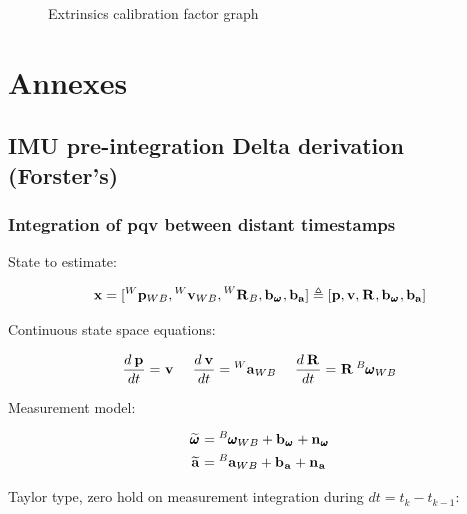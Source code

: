 \documentclass[11pt]{article}
\newcommand{\Rot}[2]{\prescript{#1}{}{\bfR}_{#2}}
\newcommand{\noise}{\bfn}
\newcommand{\bias}{\bfb}
\newcommand{\posi}[2]{\prescript{#1}{}{\bfp}_{#2}}
\newcommand{\vel}[2]{\prescript{#1}{}{\bfv}_{#2}}
\newcommand{\acc}[2]{\prescript{#1}{}{\bfa}_{#2}}
\newcommand{\accm}[2]{\prescript{#1}{}{\widetilde{\bfa}}_{#2}}
\newcommand{\angvel}[2]{\prescript{#1}{}{\pmb{\omega}}_{#2}}
\newcommand{\angvelm}[2]{\prescript{#1}{}{\widetilde{\pmb{\omega}}}_{#2}}
\begin{document}
\begin{figure}[ht]
\begin{minipage}[c]{.46\linewidth}
    \label{fig:factorgraph}
    \caption{Extrinsics calibration factor graph}
\end{minipage}
\end{figure}

























\section{Annexes}
\subsection{IMU pre-integration Delta derivation (Forster's)}
\subsubsection{Integration of pqv between distant timestamps}
State to estimate:

\begin{equation*}
\bfx = [\posi{W}{WB}, \vel{W}{WB}, \Rot{W}{B}, \bias_{\angvel{}{}}, \bias_{\bfa}]
\triangleq 
[\bfp, \bfv, \Rot{}{}, \bias_{\angvel{}{}}, \bias_{\bfa}] 
\end{equation*}

Continuous state space equations:

\begin{equation*}
\frac{d\posi{}{}}{dt} = \vel{}{}  ~~~~ \frac{d\vel{}{}}{dt} = \acc{W}{WB} ~~~~ \frac{d\Rot{}{}}{dt} = \Rot{}{} \angvel{B}{WB} 
\end{equation*}

Measurement model:

\begin{equation*}
\begin{split}
\angvelm{}{} &= \angvel{B}{WB} + \bias_{\angvel{}{}} + \noise_{\angvel{}{}} 
\\
\accm{}{}    &= \acc{B}{WB} + \bias_{\acc{}{}} + \noise_{\acc{}{}} 
\end{split}
\end{equation*}


Taylor type, zero hold on measurement integration during $dt = t_k - t_{k-1}$:
\end{document}

